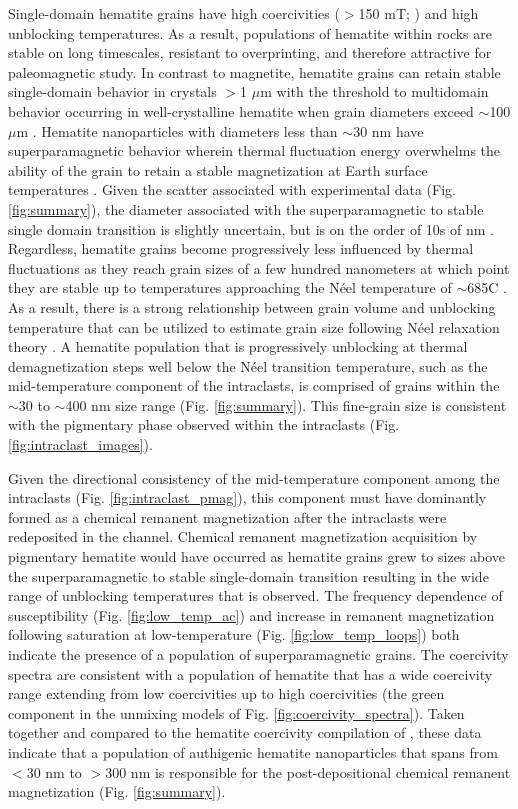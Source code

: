 \documentclass[draft]{agujournal2018}
\begin{document}
Single-domain hematite grains have high coercivities ($>$150 mT; \citealp{Ozdemir2014a}) and high unblocking temperatures. As a result, populations of hematite within rocks are stable on long timescales, resistant to overprinting, and therefore attractive for paleomagnetic study. In contrast to magnetite, hematite grains can retain stable single-domain behavior in crystals $>$1 $\mu$m with the threshold to multidomain behavior occurring in well-crystalline hematite when grain diameters exceed $\sim$100 $\mu$m \citep{Kletetschka2002a, Ozdemir2014a}. Hematite nanoparticles with diameters less than $\sim$30 nm have superparamagnetic behavior wherein thermal fluctuation energy overwhelms the ability of the grain to retain a stable magnetization at Earth surface temperatures \citep{Ozdemir2014a}. Given the scatter associated with experimental data (Fig. \ref{fig:summary}), the diameter associated with the superparamagnetic to stable single domain transition is slightly uncertain, but is on the order of 10s of nm \citep{Ozdemir2014a}. Regardless, hematite grains become progressively less influenced by thermal fluctuations as they reach grain sizes of a few hundred nanometers at which point they are stable up to temperatures approaching the N\'eel temperature of $\sim$685\textdegree C \citep{Swanson-Hysell2011a, Ozdemir2014a}. As a result, there is a strong relationship between grain volume and unblocking temperature that can be utilized to estimate grain size following N\'eel relaxation theory \citep{Neel1949a, Swanson-Hysell2011a}. A hematite population that is progressively unblocking at thermal demagnetization steps well below the N\'eel transition temperature, such as the mid-temperature component of the intraclasts, is comprised of grains within the $\sim$30 to $\sim$400 nm size range (Fig. \ref{fig:summary}). This fine-grain size is consistent with the pigmentary phase observed within the intraclasts (Fig. \ref{fig:intraclast_images}). 

Given the directional consistency of the mid-temperature component among the intraclasts (Fig. \ref{fig:intraclast_pmag}), this component must have dominantly formed as a chemical remanent magnetization after the intraclasts were redeposited in the channel. Chemical remanent magnetization acquisition by pigmentary hematite would have occurred as hematite grains grew to sizes above the superparamagnetic to stable single-domain transition resulting in the wide range of unblocking temperatures that is observed. The frequency dependence of susceptibility (Fig. \ref{fig:low_temp_ac}) and increase in remanent magnetization following saturation at low-temperature (Fig. \ref{fig:low_temp_loops}) both indicate the presence of a population of superparamagnetic grains. The coercivity spectra are consistent with a population of hematite that has a wide coercivity range extending from low coercivities up to high coercivities (the green component in the unmixing models of Fig. \ref{fig:coercivity_spectra}). Taken together and compared to the hematite coercivity compilation of \cite{Ozdemir2014a}, these data indicate that a population of authigenic hematite nanoparticles that spans from $<$30 nm to $>$300 nm is responsible for the post-depositional chemical remanent magnetization (Fig. \ref{fig:summary}). 
\end{document}
